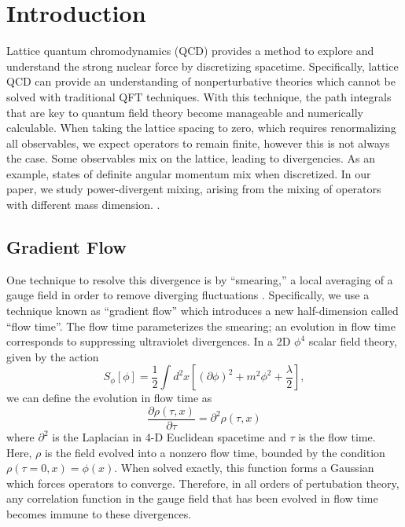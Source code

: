 \documentclass[12pt]{article}
\begin{document}
\section{Introduction}
\indent Lattice quantum chromodynamics (QCD) provides a method to explore and understand the strong nuclear force by discretizing spacetime. Specifically, lattice QCD can provide an understanding of nonperturbative theories which cannot be solved with traditional QFT techniques. With this technique, the path integrals that are key to quantum field theory become manageable and numerically calculable. When taking the lattice spacing to zero, which requires renormalizing all observables, we expect operators to remain finite, however this is not always the case. Some observables mix on the lattice, leading to divergencies. As an example, states of definite angular momentum mix when discretized. In our paper, we study power-divergent mixing, arising from the mixing of operators with different mass dimension. \cite{monahan2016}.

\subsection{Gradient Flow}

One technique to resolve this divergence is by ``smearing,'' a local averaging of a gauge field in order to remove diverging fluctuations \cite{solbrig2007}. Specifically, we use a technique known as ``gradient flow'' \cite{monahan2015} which introduces a new half-dimension called ``flow time''. The flow time parameterizes the smearing; an evolution in flow time corresponds to suppressing ultraviolet divergences. In a 2D $\phi^4$ scalar field theory, given by the action
\begin{equation}
    S_\phi [\phi] = \frac{1}{2}\int d^2x\left[(\partial \phi)^2+m^2\phi^2+\frac{\lambda}{2}\right],
\end{equation}
we can define the evolution in flow time as
\begin{equation}
    \frac{\partial \rho(\tau, x)}{\partial \tau} = \partial^2 \rho(\tau,x)
\end{equation}
where $\partial^2$ is the Laplacian in 4-D Euclidean spacetime and $\tau$ is the flow time. Here, $\rho$ is the field evolved into a nonzero flow time, bounded by the condition $\rho(\tau=0,x) = \phi(x)$. When solved exactly, this function forms a Gaussian which forces operators to converge. Therefore, in all orders of pertubation theory, any correlation function in the gauge field that has been evolved in flow time becomes immune to these divergences\cite{makino2015a}.
\end{document}
